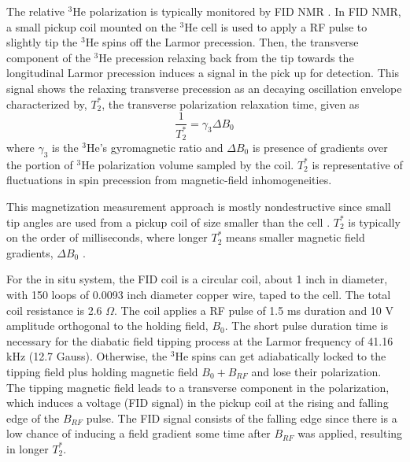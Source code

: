 The relative $^3$He polarization is typically monitored by FID NMR \cite{Bloch1946, Abragam1961}. In FID NMR, a small pickup coil mounted on the $^3$He cell is used to apply a RF pulse to slightly tip the $^3$He spins off the Larmor precession. Then, the transverse component of the $^3$He precession relaxing back from the tip towards the longitudinal Larmor precession induces a signal in the pick up for detection. This signal shows the relaxing transverse precession as an decaying oscillation envelope characterized by, $T_2^*$, the transverse polarization relaxation time, given as
\begin{equation}
    \frac{1}{T_2^*} = \gamma_3 \Delta B_0
\end{equation}
where $\gamma_3$ is the $^3$He's gyromagnetic ratio and $\Delta B_0$ is presence of gradients over the portion of $^3$He polarization volume sampled by the coil. $T_2^*$ is representative of fluctuations in spin precession from magnetic-field inhomogeneities.

This magnetization measurement approach is mostly nondestructive since small tip angles are used from a pickup coil of size smaller than the cell \cite{Lorenzon1993, Parnell2008, Chen2011}. $T_2^*$ is typically on the order of milliseconds, where longer $T_2^*$ means smaller magnetic field gradients, $\Delta B_0$ \cite{Lorenzon1993,  Parnell2008, Chen2011}.

For the in situ system, the FID coil is a circular coil, about 1 inch in diameter, with 150 loops of 0.0093 inch diameter copper wire, taped to the cell. The total coil resistance is 2.6 $\Omega$. The coil applies a RF pulse of 1.5 ms duration and 10 V amplitude orthogonal to the holding field, $B_0$. The short pulse duration time is necessary for the diabatic field tipping process at the Larmor frequency of 41.16 kHz (12.7 Gauss). Otherwise, the $^3$He spins can get adiabatically locked to the tipping field plus holding magnetic field $B_0+B_{RF}$ and lose their polarization. The tipping magnetic field leads to a transverse component in the polarization, which induces a voltage (FID signal) in the pickup coil at the rising and falling edge of the $B_{RF}$ pulse. The FID signal consists of the falling edge since there is a low chance of inducing a field gradient some time after $B_{RF}$ was applied, resulting in longer $T_2^*$. 

